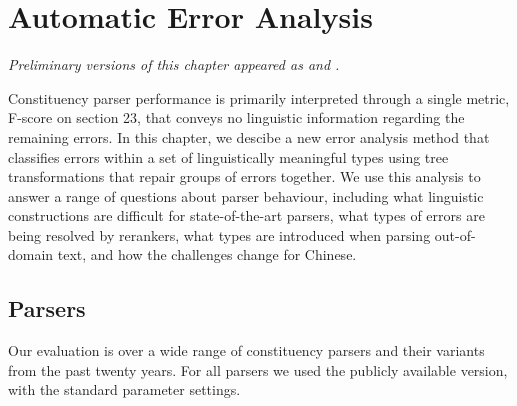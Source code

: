 \chapter{Automatic Error Analysis} \label{chp:analysis}

\begin{center}
\textit{
  Preliminary versions of this chapter appeared as \textcite{Kummerfeld-etal:2012:EMNLP} and \textcite{Kummerfeld-etal:2013:ACL}.
}
\end{center}

Constituency parser performance is primarily interpreted through a single metric, F-score on \wsj section 23, that conveys no linguistic information regarding the remaining errors.
In this chapter, we descibe a new error analysis method that classifies errors within a set of linguistically meaningful types using tree transformations that repair groups of errors together.
We use this analysis to answer a range of questions about parser behaviour, including what linguistic constructions are difficult for state-of-the-art parsers, what types of errors are being resolved by rerankers, what types are introduced when parsing out-of-domain text, and how the challenges change for Chinese.


\section{Parsers}

Our evaluation is over a wide range of \ptb constituency parsers and their variants from the past twenty years.
For all parsers we used the publicly available version, with the standard parameter settings.

